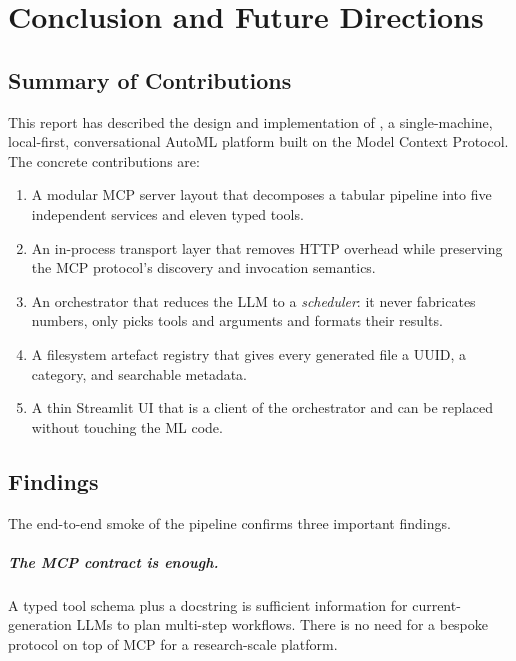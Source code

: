 \chapter{Conclusion and Future Directions}
\label{ch:conclusion}

\section{Summary of Contributions}
\label{sec:sum-contrib}

This report has described the design and implementation of
\projname, a single-machine, local-first, conversational AutoML
platform built on the Model Context Protocol. The concrete
contributions are:

\begin{enumerate}[leftmargin=1.4em]
  \item A modular MCP server layout that decomposes a tabular
        pipeline into five independent services and eleven typed
        tools.
  \item An in-process transport layer that removes HTTP overhead
        while preserving the MCP protocol's discovery and
        invocation semantics.
  \item An orchestrator that reduces the LLM to a
        \emph{scheduler}: it never fabricates numbers, only picks
        tools and arguments and formats their results.
  \item A filesystem artefact registry that gives every generated
        file a UUID, a category, and searchable metadata.
  \item A thin Streamlit UI that is a client of the orchestrator
        and can be replaced without touching the ML code.
\end{enumerate}

\section{Findings}
\label{sec:findings}

The end-to-end smoke of the pipeline confirms three important
findings.

\paragraph{The MCP contract is enough.}
A typed tool schema plus a docstring is sufficient information for
current-generation LLMs to plan multi-step workflows. There is no
need for a bespoke protocol on top of MCP for a research-scale
platform.

